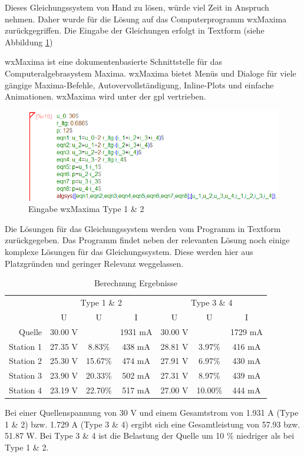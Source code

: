 Dieses Gleichungssystem von Hand zu lösen, würde viel Zeit in Anspruch nehmen.
Daher wurde für die Lösung auf das Computerprogramm wxMaxima zurückgegriffen.
Die Eingabe der Gleichungen erfolgt in Textform (siehe Abbildung \ref{fig:maxima-input})\par

wxMaxima ist eine dokumentenbasierte Schnittstelle für das Computeralgebrasystem Maxima. wxMaxima bietet Menüs und Dialoge für viele gängige Maxima-Befehle, Autovervollständigung, Inline-Plots und einfache Animationen. wxMaxima wird unter der \ac{gpl} vertrieben. \cite[aus dem Englischen übersetzt]{wxmaxima}\par

\begin{figure}[htbp!]
	\centering
	\includegraphics[width=.9\linewidth]{images/berechnung/max_2pair_30V.png}
	\caption{Eingabe wxMaxima Type 1 \& 2}
	\label{fig:maxima-input}
\end{figure}

Die Lösungen für das Gleichungssystem werden vom Programm in Textform zurückgegeben.
Das Programm findet neben der relevanten Lösung noch einige komplexe Lösungen für das Gleichungssystem.
Diese werden hier aus Platzgründen und geringer Relevanz weggelassen.
\begin{table}[htbp!]
	\centering
	\begin{tabular}{r|ccc|ccc}
		\toprule
		&\multicolumn{3}{c|}{Type 1 \& 2}&\multicolumn{3}{c}{Type 3 \& 4}\\\cmidrule{2-7}
		&U&\tdelta U&I&U&\tdelta U&I\\
		\midrule
		Quelle&30.00 V&&1931 mA&30.00 V&&1729 mA\\
		\midrule
		Station 1&27.35 V& 8.83\%&438 mA&28.81 V& 3.97\%&416 mA\\
		Station 2&25.30 V&15.67\%&474 mA&27.91 V& 6.97\%&430 mA\\
		Station 3&23.90 V&20.33\%&502 mA&27.31 V& 8.97\%&439 mA\\
		Station 4&23.19 V&22.70\%&517 mA&27.00 V&10.00\%&444 mA\\
		\bottomrule
	\end{tabular}
	\caption{Berechnung Ergebnisse}
\end{table}
Bei einer Quellenspannung von 30 V und einem Gesamtstrom von 1.931 A (Type 1 \& 2) bzw. 1.729 A (Type 3 \& 4) ergibt sich eine Gesamtleistung von 57.93 bzw. 51.87 W.
Bei Type 3 \& 4 ist die Belastung der Quelle um 10 \% niedriger als bei Type 1 \& 2.

